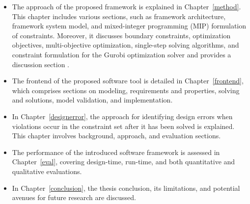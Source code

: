 \begin{itemize}
        \item  %
       The approach of the proposed framework is explained in Chapter~\ref{method}. This chapter includes various sections, such as framework architecture, framework system model, and mixed-integer programming (MIP) formulation of constraints. Moreover, it discusses boundary constraints, optimization objectives, multi-objective optimization, single-step solving algorithms, and constraint formulation for the Gurobi optimization solver and provides a discussion section \cite{gurobi}.
        
        \item %
        The frontend of the proposed software tool is detailed in Chapter~\ref{frontend}, which comprises sections on modeling, requirements and properties, solving and solutions, model validation, and implementation.
        
        \item %
        In Chapter~\ref{designerror}, the approach for identifying design errors when violations occur in the constraint set after it has been solved is explained. This chapter involves background, approach, and evaluation sections.
        
        \item %
        The performance of the introduced software framework is assessed in Chapter~\ref{eval}, covering design-time, run-time, and both quantitative and qualitative evaluations.
        
        \item  %
        In Chapter~\ref{conclusion}, the thesis conclusion, its limitations, and potential avenues for future research are discussed.
        
    \end{itemize}
    
